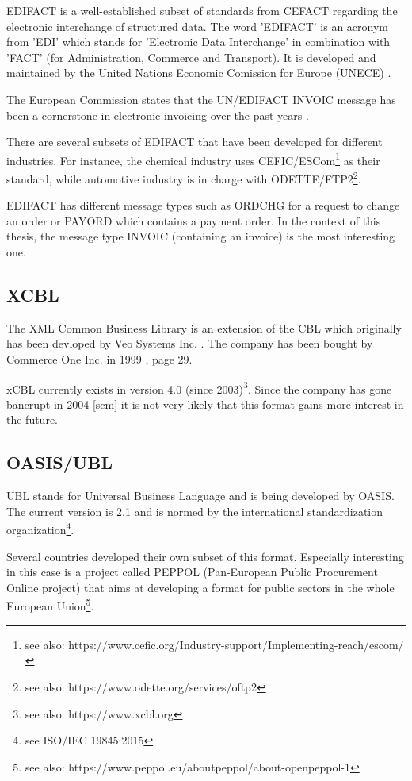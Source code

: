 EDIFACT is a well-established \cite{basware} subset of standards from CEFACT regarding the electronic interchange of structured data. The word 'EDIFACT' is an acronym from 'EDI' which stands for 'Electronic Data Interchange' in combination with 'FACT' (for Administration, Commerce and Transport). It is developed and maintained by the United Nations Economic Comission for Europe (UNECE) \cite{unece}.

The European Commission states that the UN/EDIFACT INVOIC message has been a cornerstone in electronic invoicing over the past years \cite{ECInvcStandardization, page 14}.

There are several subsets of EDIFACT that have been developed for different industries. For instance, the chemical industry uses CEFIC/ESCom\footnote{see also: https://www.cefic.org/Industry-support/Implementing-reach/escom/} as their standard, while automotive industry is in charge with ODETTE/FTP2\footnote{see also: https://www.odette.org/services/oftp2}.

EDIFACT has different message types such as ORDCHG for a request to change an order or PAYORD which contains a payment order. In the context of this thesis, the message type INVOIC (containing an invoice) is the most interesting one.

\subsection{XCBL}
\label{sec2.1.2}

The XML Common Business Library is an extension of the CBL which originally has been devloped by Veo Systems Inc. \cite{coverpages}. The company has been bought by Commerce One Inc. in 1999 \cite{co}, page 29. 

xCBL currently exists in version 4.0 (since 2003)\footnote{see also: https://www.xcbl.org}. Since the company has gone bancrupt in 2004 \ref{scm} it is not very likely that this format gains more interest in the future.

\subsection{OASIS/UBL}
\label{sec2.1.3}

UBL stands for Universal Business Language and is being developed by OASIS. The current version is 2.1 and is normed by the international standardization organization\footnote{see ISO/IEC 19845:2015}.

Several countries developed their own subset of this format. Especially interesting in this case is a project called PEPPOL (Pan-European Public Procurement Online project) that aims at developing a format for public sectors in the whole European Union\footnote {see also: https://www.peppol.eu/about\textunderscore peppol/about-openpeppol-1}. 

